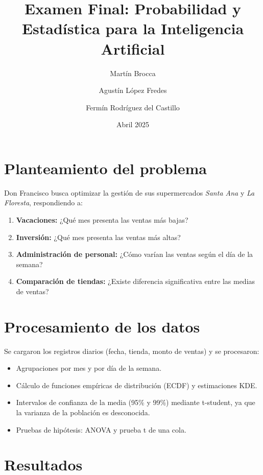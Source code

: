 \documentclass[12pt,a4paper]{article}
\title{Examen Final: Probabilidad y Estadística para la Inteligencia Artificial}
\author{Martín Brocca \and Agustín López Fredes \and Fermín Rodríguez del Castillo}
\date{Abril 2025}
\begin{document}
\maketitle

\section{Planteamiento del problema}
Don Francisco busca optimizar la gestión de sus supermercados \emph{Santa Ana} y \emph{La Floresta}, respondiendo a:
\begin{enumerate}
  \item \textbf{Vacaciones:} ¿Qué mes presenta las ventas más bajas?  
  \item \textbf{Inversión:} ¿Qué mes presenta las ventas más altas?  
  \item \textbf{Administración de personal:} ¿Cómo varían las ventas según el día de la semana?  
  \item \textbf{Comparación de tiendas:} ¿Existe diferencia significativa entre las medias de ventas?  
\end{enumerate}

\section{Procesamiento de los datos}
Se cargaron los registros diarios (fecha, tienda, monto de ventas) y se procesaron:
\begin{itemize}
  \item Agrupaciones por mes y por día de la semana.  
  \item Cálculo de funciones empíricas de distribución (ECDF) y estimaciones KDE.  
  \item Intervalos de confianza de la media (95\% y 99\%) mediante t-student, ya que la varianza de la población es desconocida.  
  \item Pruebas de hipótesis: ANOVA y prueba t de una cola.  
\end{itemize}

\section{Resultados}
\end{document}
